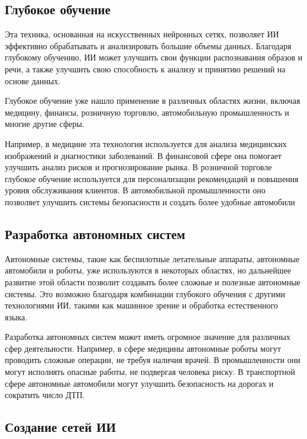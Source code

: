 \documentclass[bachelor,och,referat]{SCWorks_corrected}
\begin{document}
\subsection{Глубокое обучение}
    
Эта техника, основанная на искусственных нейронных сетях, позволяет ИИ эффективно обрабатывать и анализировать большие объемы данных. Благодаря глубокому обучению, ИИ может улучшить свои функции распознавания образов и речи, а также улучшить свою способность к анализу и принятию решений на основе данных.\cite{N5}
    
Глубокое обучение уже нашло применение в различных областях жизни, включая медицину, финансы, розничную торговлю, автомобильную промышленность и многие другие сферы. 

Например, в медицине эта технология используется для анализа медицинских изображений и диагностики заболеваний. В финансовой сфере она помогает улучшить анализ рисков и прогнозирование рынка. В розничной торговле глубокое обучение используется для персонализации рекомендаций и повышения уровня обслуживания клиентов. В автомобильной промышленности оно позволяет улучшить системы безопасности и создать более удобные автомобили
    
\subsection{Разработка автономных систем}

Автономные системы, такие как беспилотные летательные аппараты, автономные автомобили и роботы, уже используются в некоторых областях, но дальнейшее развитие этой области позволит создавать более сложные и полезные автономные системы. Это возможно благодаря комбинации глубокого обучения с другими технологиями ИИ, такими как машинное зрение и обработка естественного языка.

Разработка автономных систем может иметь огромное значение для различных сфер деятельности. Например, в сфере медицины автономные роботы могут проводить сложные операции, не требуя наличия врачей. В промышленности они могут исполнять опасные работы, не подвергая человека риску. В транспортной сфере автономные автомобили могут улучшить безопасность на дорогах и сократить число ДТП.
    
\subsection{Создание сетей ИИ}
    
\end{document}
